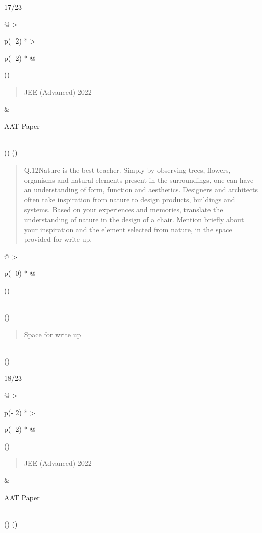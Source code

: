 \documentclass[
]{article}
\begin{document}
17/23

\begin{longtable}[]{@{}
  >{\raggedright\arraybackslash}p{(\columnwidth - 2\tabcolsep) * }
  >{\raggedright\arraybackslash}p{(\columnwidth - 2\tabcolsep) * }@{}}
\toprule()
\begin{minipage}[b]{\linewidth}\raggedright
\begin{quote}
JEE (Advanced) 2022
\end{quote}
\end{minipage} & \begin{minipage}[b]{\linewidth}\raggedright
AAT Paper
\end{minipage} \\
\midrule()
\endhead
\bottomrule()
\end{longtable}

\begin{quote}
Q.12Nature is the best teacher. Simply by observing trees, flowers,
organisms and natural elements present in the surroundings, one can have
an understanding of form, function and aesthetics. Designers and
architects often take inspiration from nature to design products,
buildings and systems. Based on your experiences and memories, translate
the understanding of nature in the design of a chair. Mention briefly
about your inspiration and the element selected from nature, in the
space provided for write-up.
\end{quote}

\begin{longtable}[]{@{}
  >{\raggedright\arraybackslash}p{(\columnwidth - 0\tabcolsep) * }@{}}
\toprule()
\begin{minipage}[b]{\linewidth}\raggedright
\end{minipage} \\
\midrule()
\endhead
\begin{minipage}[t]{\linewidth}\raggedright
\begin{quote}
Space for write up
\end{quote}
\end{minipage} \\
\bottomrule()
\end{longtable}

18/23

\begin{longtable}[]{@{}
  >{\raggedright\arraybackslash}p{(\columnwidth - 2\tabcolsep) * }
  >{\raggedright\arraybackslash}p{(\columnwidth - 2\tabcolsep) * }@{}}
\toprule()
\begin{minipage}[b]{\linewidth}\raggedright
\begin{quote}
JEE (Advanced) 2022
\end{quote}
\end{minipage} & \begin{minipage}[b]{\linewidth}\raggedright
AAT Paper
\end{minipage} \\
\midrule()
\endhead
\bottomrule()
\end{longtable}
\end{document}
